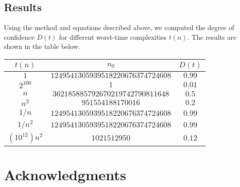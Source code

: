 \documentclass[draft]{article}
\theoremstyle{definition}
\begin{document}
\subsection{Results}
Using the method and equations described above, we computed the degree of confidence $D(t)$ for different worst-time complexities $t(n)$. The results are shown in the table below.

\begin{center}
\begin{tabular}{|c|c|c|}
     $t(n)$ & $n_0$ & $D(t)$ \\ [0.5ex]
     \hline \hline
     $1$ & $1249541305939518220676374724608$ & $0.99$ \\
     \hline
     $2^{100}$ & $1$ & $0.01$ \\
     \hline
     $n$ & $362185885792670219742790811648$ & $0.5$ \\
     \hline
     $n^2$ & $951554188170016$ & $0.2$ \\
     \hline
     $1/n$ & $1249541305939518220676374724608$ & $0.99$ \\
     \hline
     $1/n^2$ & $1249541305939518220676374724608$ & $0.99$ \\
     \hline
     $(10^{12})n^2$ & $1021512950$ & $0.12$
\end{tabular}
\end{center}

\section*{Acknowledgments}
\end{document}
